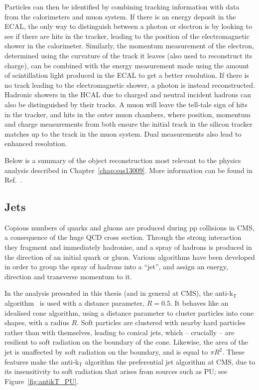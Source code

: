 Particles can then be identified by combining tracking information with data from the calorimeters and muon system.
If there is an energy deposit in the \ac{ECAL}, the only way to distinguish between a photon or electron is by looking to see if there are hits in the tracker, leading to the position of the electromagnetic shower in the calorimeter. 
Similarly, the momentum measurement of the electron, determined using the curvature of the track it leaves (also used to reconstruct its charge), can be combined with the energy measurement made using the amount of scintillation light produced in the \ac{ECAL} to get a better resolution.
If there is no track leading to the electromagnetic shower, a photon is instead reconstructed.
Hadronic showers in the \ac{HCAL} due to charged and neutral incident hadrons can also be distinguished by their tracks.
A muon will leave the tell-tale sign of hits in the tracker, and hits in the outer muon chambers, where position, momentum and charge measurements from both ensure the initial track in the silicon tracker matches up to the track in the muon system. Dual measurements also lead to enhanced resolution.


Below is a summary of the object reconstruction most relevant to the physics analysis described in Chapter~\ref{chap:sus13009}. 
More information can be found in Ref.~\cite{TDRVOL1}.


\subsection{Jets}
Copious numbers of quarks and gluons are produced during pp collisions in \ac{CMS}, a consequence of the huge \ac{QCD} cross section.
Through the strong interaction they fragment and immediately hadronise, and a spray of hadrons is produced in the direction of an initial quark or gluon.
Various algorithms have been developed in order to group the spray of hadrons into a ``jet'', and assign an energy, direction and transverse momentum to it.

In the analysis presented in this thesis (and in general at \ac{CMS}), the anti-k$_{\mathrm{T}}$ algorithm~\cite{bib:akjets} is used with a distance parameter, $R = 0.5$.
It behaves like an idealised cone algorithm, using a distance parameter to cluster particles into cone shapes, with a radius $R$. Soft particles are clustered with nearby hard particles rather than with themselves, leading to conical jets, which -- crucially -- are resilient to soft radiation on the boundary of the cone.
Likewise, the area of the jet is unaffected by soft radiation on the boundary, and is equal to $\pi R^{2}$. 
These features make the anti-k$_{\mathrm{T}}$ algorithm the preferential jet algorithm at \ac{CMS}, due to its insensitivity to soft radiation that arises from sources such as \ac{PU}; see Figure~\ref{fig:antikT_PU}. 

